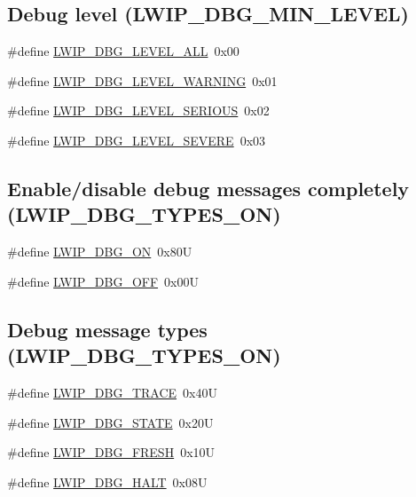 \subsection*{Debug level (L\+W\+I\+P\+\_\+\+D\+B\+G\+\_\+\+M\+I\+N\+\_\+\+L\+E\+V\+EL)}
\begin{DoxyCompactItemize}
\item 
\#define \hyperlink{group__debugging__levels_ga8ebaeb006b43f55897f3196b3617dc87}{L\+W\+I\+P\+\_\+\+D\+B\+G\+\_\+\+L\+E\+V\+E\+L\+\_\+\+A\+LL}~0x00
\item 
\#define \hyperlink{group__debugging__levels_ga77c491e468bf7d9a1bc48430c1866a96}{L\+W\+I\+P\+\_\+\+D\+B\+G\+\_\+\+L\+E\+V\+E\+L\+\_\+\+W\+A\+R\+N\+I\+NG}~0x01
\item 
\#define \hyperlink{group__debugging__levels_ga0269bdc51f1e8a5ecf9af72c6e1c996c}{L\+W\+I\+P\+\_\+\+D\+B\+G\+\_\+\+L\+E\+V\+E\+L\+\_\+\+S\+E\+R\+I\+O\+US}~0x02
\item 
\#define \hyperlink{group__debugging__levels_gaab41143277cd38047b6660d90e9cec3b}{L\+W\+I\+P\+\_\+\+D\+B\+G\+\_\+\+L\+E\+V\+E\+L\+\_\+\+S\+E\+V\+E\+RE}~0x03
\end{DoxyCompactItemize}
\subsection*{Enable/disable debug messages completely (L\+W\+I\+P\+\_\+\+D\+B\+G\+\_\+\+T\+Y\+P\+E\+S\+\_\+\+ON)}
\begin{DoxyCompactItemize}
\item 
\#define \hyperlink{group__debugging__levels_ga9e31b7cbbc8f46af8e62b548079acd4e}{L\+W\+I\+P\+\_\+\+D\+B\+G\+\_\+\+ON}~0x80U
\item 
\#define \hyperlink{group__debugging__levels_gadab1cdc3f45939a3a5c9a3d7e04987e1}{L\+W\+I\+P\+\_\+\+D\+B\+G\+\_\+\+O\+FF}~0x00U
\end{DoxyCompactItemize}
\subsection*{Debug message types (L\+W\+I\+P\+\_\+\+D\+B\+G\+\_\+\+T\+Y\+P\+E\+S\+\_\+\+ON)}
\begin{DoxyCompactItemize}
\item 
\#define \hyperlink{group__debugging__levels_ga988147559b78642ac881815b66023646}{L\+W\+I\+P\+\_\+\+D\+B\+G\+\_\+\+T\+R\+A\+CE}~0x40U
\item 
\#define \hyperlink{group__debugging__levels_ga511ee3deb3240635f5ec6a1709c6d741}{L\+W\+I\+P\+\_\+\+D\+B\+G\+\_\+\+S\+T\+A\+TE}~0x20U
\item 
\#define \hyperlink{group__debugging__levels_ga7d44d1804fa5e747aed86816e2a6cae0}{L\+W\+I\+P\+\_\+\+D\+B\+G\+\_\+\+F\+R\+E\+SH}~0x10U
\item 
\#define \hyperlink{group__debugging__levels_gab0a296414983155b30ad51871606b90f}{L\+W\+I\+P\+\_\+\+D\+B\+G\+\_\+\+H\+A\+LT}~0x08U
\end{DoxyCompactItemize}



